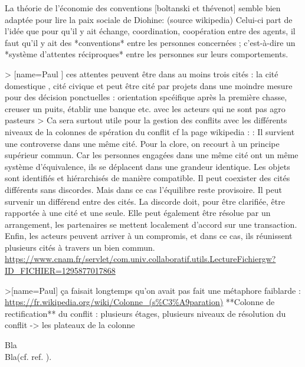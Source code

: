 La théorie de l'économie des conventions [boltanski et thévenot]  semble bien adaptée pour lire la paix sociale de Diohine: (source wikipedia) Celui-ci part de l'idée que pour qu'il y ait échange, coordination, coopération entre des agents, il faut qu'il y ait des *conventions* entre les personnes concernées ; c’est-à-dire un *système d'attentes réciproques* entre les personnes sur leurs comportements.

> [name=Paul ] ces attentes peuvent être dans au moins trois cités : la cité domestique , cité civique et peut être cité par projets dans une moindre mesure pour des décision ponctuelles : orientation spcéifique après la première chasse, creuser un puits, établir une banque etc. avec les acteurs qui ne sont pas agro pasteurs 
> Ca sera surtout utile pour la gestion des conflits avec les différents niveaux de la colonnes de spération du conflit  cf la page wikipedia : :     Il survient une controverse dans une même cité. Pour la clore, on recourt à un principe supérieur commun. Car les personnes engagées dans une même cité ont un même système d'équivalence, ils se déplacent dans une grandeur identique. Les objets sont identifiés et hiérarchisés de manière compatible.
    Il peut coexister des cités différents sans discordes. Mais dans ce cas l'équilibre reste provisoire.
    Il peut survenir un différend entre des cités. La discorde doit, pour être clarifiée, être rapportée à une cité et une seule. Elle peut également être résolue par un arrangement, les partenaires se mettent localement d'accord sur une transaction. Enfin, les acteurs peuvent arriver à un compromis, et dans ce cas, ils réunissent plusieurs cités à travers un bien commun.
   \url{ https://www.cnam.fr/servlet/com.univ.collaboratif.utils.LectureFichiergw?ID_FICHIER=1295877017868}


>[name=Paul] ça faisait longtemps qu'on avait pas fait une métaphore faiblarde : \url{https://fr.wikipedia.org/wiki/Colonne_(s%C3%A9paration)} 
**Colonne de rectification** du conflit : plusieurs étages, plusieurs niveaux de résolution du conflit -> les plateaux de la colonne


Bla\footnotemark\\

Bla(cf. ref. \cite{cite6}).

